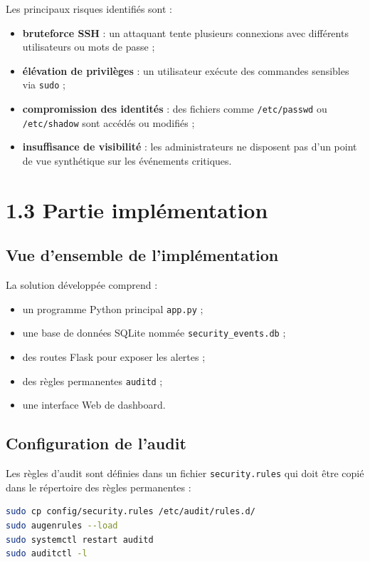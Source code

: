 \documentclass[12pt,a4paper]{article}
\begin{document}
Les principaux risques identifiés sont :
\begin{itemize}
    \item \textbf{bruteforce SSH} : un attaquant tente plusieurs connexions avec différents utilisateurs ou mots de passe ;
    \item \textbf{élévation de privilèges} : un utilisateur exécute des commandes sensibles via \texttt{sudo} ;
    \item \textbf{compromission des identités} : des fichiers comme \texttt{/etc/passwd} ou \texttt{/etc/shadow} sont accédés ou modifiés ;
    \item \textbf{insuffisance de visibilité} : les administrateurs ne disposent pas d’un point de vue synthétique sur les événements critiques.
\end{itemize}

\section{1.3 Partie implémentation}

\subsection{Vue d’ensemble de l’implémentation}

La solution développée comprend :
\begin{itemize}
    \item un programme Python principal \texttt{app.py} ;
    \item une base de données SQLite nommée \texttt{security\_events.db} ;
    \item des routes Flask pour exposer les alertes ;
    \item des règles permanentes \texttt{auditd} ;
    \item une interface Web de dashboard.
\end{itemize}

\subsection{Configuration de l’audit}

Les règles d’audit sont définies dans un fichier \texttt{security.rules} qui doit être copié dans le répertoire des règles permanentes :

\begin{lstlisting}[language=bash, caption=Déploiement de la configuration d’audit]
sudo cp config/security.rules /etc/audit/rules.d/
sudo augenrules --load
sudo systemctl restart auditd
sudo auditctl -l
\end{lstlisting}
\end{document}
